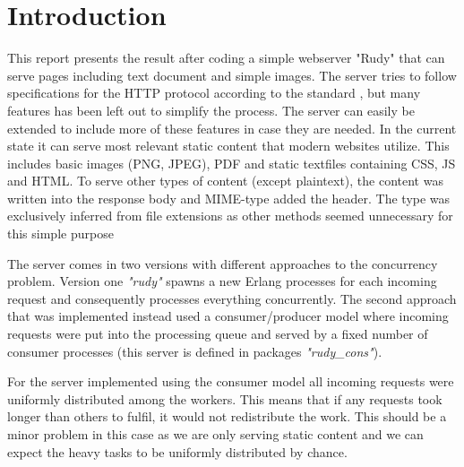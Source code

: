 \chapter{Introduction} 
\label{chap_Intro}

This report presents the result after coding a simple webserver "Rudy" that can serve pages including text document and simple images. The server tries to follow specifications for the HTTP protocol according to the standard \cite{http-rfc}, but many features has been left out to simplify the process. The server can easily be extended to include  more of these features in case they are needed. In the current state it can serve most relevant static content that modern websites utilize. This includes basic images (PNG, JPEG), PDF and static textfiles containing CSS, JS and HTML. To serve other types of content (except plaintext), the content was written into the response body and MIME-type added the header. The type was exclusively inferred from file extensions as other methods seemed unnecessary for this simple purpose

The server comes in two versions with different approaches to the concurrency problem. Version one \textit{"rudy"} spawns a new Erlang processes for each incoming request and consequently processes everything concurrently. The second approach that was implemented instead used a consumer/producer model where incoming requests were put into the processing queue and served by a fixed number of consumer processes (this server is defined in packages \textit{"rudy\_cons"}).

For the server implemented using the consumer model all incoming requests were uniformly distributed among the workers. This means that if any requests took longer than others to fulfil, it would not redistribute the work. This should be a minor problem in this case as we are only serving static content and we can expect the heavy tasks to be uniformly distributed by chance.  


